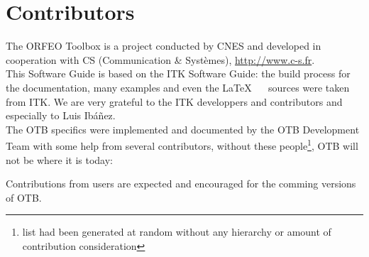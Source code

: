 \chapter*{Contributors}
\noindent

The ORFEO Toolbox is a project conducted by CNES and developed in
cooperation with CS (Communication \& Syst\`{e}mes), \url{http://www.c-s.fr}.\\

This Software Guide is based on the ITK Software Guide: the build
process for the documentation, many examples and even the \LaTeX~ ~
sources were taken from ITK. We are very grateful to the ITK
developpers and contributors and especially to Luis Ib\'a\~nez.\\

The OTB specifics were implemented and documented by the OTB Development Team with some help from several contributors, without these people\footnote{list had been generated at random without any hierarchy or amount of contribution consideration}, OTB will not be where it is today:



Contributions from users are expected and encouraged for the comming
versions of OTB.

